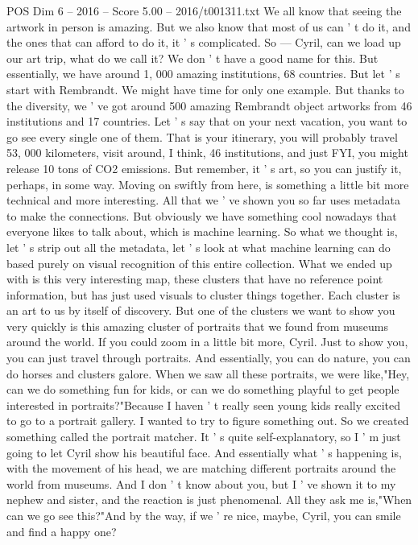 \begin{textsample}{POS Dim 6 – 2016 – Score 5.00 – 2016/t001311.txt}
We all know that seeing the artwork in person is amazing.
But we also know that most of us can ' t do it, and the ones that can afford to do it, it ' s complicated.
So — Cyril, can we load up our art trip, what do we call it?
We don ' t have a good name for this.
But essentially, we have around 1, 000 amazing institutions, 68 countries.
But let ' s start with Rembrandt.
We might have time for only one example.
But thanks to the diversity, we ' ve got around 500 amazing Rembrandt object artworks from 46 institutions and 17 countries.
Let ' s say that on your next vacation, you want to go see every single one of them.
That is your itinerary, you will probably travel 53, 000 kilometers, visit around, I think, 46 institutions, and just FYI, you might release 10 tons of CO2 emissions.
But remember, it ' s art, so you can justify it, perhaps, in some way.
Moving on swiftly from here, is something a little bit more technical and more interesting.
All that we ' ve shown you so far uses metadata to make the connections.
But obviously we have something cool nowadays that everyone likes to talk about, which is machine learning.
So what we thought is, let ' s strip out all the metadata, let ' s look at what machine learning can do based purely on visual recognition of this entire collection.
What we ended up with is this very interesting map, these clusters that have no reference point information, but has just used visuals to cluster things together.
Each cluster is an art to us by itself of discovery.
But one of the clusters we want to show you very quickly is this amazing cluster of portraits that we found from museums around the world.
If you could zoom in a little bit more, Cyril.
Just to show you, you can just travel through portraits.
And essentially, you can do nature, you can do horses and clusters galore.
When we saw all these portraits, we were like,"Hey, can we do something fun for kids, or can we do something playful to get people interested in portraits?"Because I haven ' t really seen young kids really excited to go to a portrait gallery.
I wanted to try to figure something out.
So we created something called the portrait matcher.
It ' s quite self-explanatory, so I ' m just going to let Cyril show his beautiful face.
And essentially what ' s happening is, with the movement of his head, we are matching different portraits around the world from museums.
And I don ' t know about you, but I ' ve shown it to my nephew and sister, and the reaction is just phenomenal.
All they ask me is,"When can we go see this?"And by the way, if we ' re nice, maybe, Cyril, you can smile and find a happy one?

\end{textsample}
